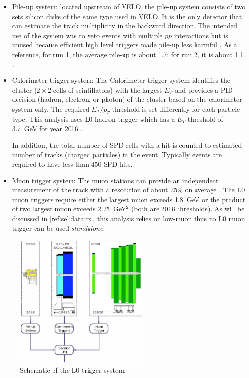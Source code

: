 \begin{itemize}
    \item Pile-up system:
        located upstream of VELO, the pile-up system consists of two sets
        silicon disks of the same type used in VELO.
        It is the only detector that can estimate the track multiplicity
        in the backward direction.
        The intended use of the system was to veto events with multiple $pp$
        interactions but is unused because efficient high level triggers
        made pile-up less harmful \cite{Oggero:1635658}.
        As a reference, for run 1, the average pile-up is about 1.7;
        for run 2, it is about 1.1
        \cite{d_Argent_2017}.

    \item Calorimeter trigger system:
        The Calorimeter trigger system identifies the cluster
        ($2 \times 2$ cells of scintillators) with the largest
        $E_T$ and provides a PID decision (hadron, electron, or photon) of the
        cluster based on the calorimeter system only.
        The required $E_T / p_T$ threshold is set differently
        for each particle type.
        This analysis uses L0 hadron trigger which has a $E_T$ threshold
        of 3.7~GeV for year 2016 \cite{LHCb-DP-2019-001}.

        In addition, the total number of SPD cells with a hit is counted to
        estimated number of tracks (charged particles) in the event.
        Typically events are required to have less than 450 SPD hits.

    \item Muon trigger system:
        The muon stations can provide an independent measurement of the track
        \pt with a resolution of about 25\% on average
        \cite{LHCb-DP-2019-001}.
        The L0 muon triggers require either the largest muon \pt exceeds
        1.8~GeV or the product of two largest muon \pt exceeds 2.25~GeV$^2$
        (both are 2016 thresholds).
        As will be discussed in \cref{ref:sel:data:rs},
        this analysis relies on low-\pt muon thus no L0 muon trigger can be
        used \emph{standalone}.
\end{itemize}

\begin{figure}[!htb]
    \centering
    \includegraphics[width=0.6\textwidth]{./figs-detector/trigger/l0_system_schematic.pdf}
    \caption{
        Schematic of the L0 trigger system.
    }
    \label{fig:l0-schematic}
\end{figure}
